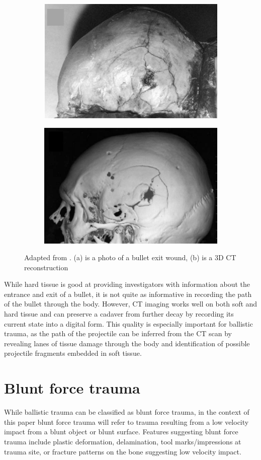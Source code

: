 \documentclass[titlepage]{article}
\begin{document}
\begin{figure}[h!]
\centering
\begin{subfigure}{.5\textwidth}
  \centering
  \includegraphics[width=.7\linewidth]{exit}
  \caption{}
  \end{subfigure}%
\begin{subfigure}{.5\textwidth}
  \centering
  \includegraphics[width=.7\linewidth]{exit_ct}
  \caption{}
\end{subfigure}
\caption{Adapted from \cite{post-imaging}. (a) is a photo of a bullet exit wound, (b) is a 3D CT reconstruction}
\label{fig:exit_wound}
\end{figure}

While hard tissue is good at providing investigators with information about the entrance and exit of a bullet, it is not quite as informative in recording the path of the bullet through the body. However, CT imaging works well on both soft and hard tissue and can preserve a cadaver from further decay by recording its current state into a digital form. This quality is especially important for ballistic trauma, as the path of the projectile can be inferred from the CT scan by revealing lanes of tissue damage through the body and identification of possible projectile fragments embedded in soft tissue.

\section{Blunt force trauma}
While ballistic trauma can be classified as blunt force trauma, in the context of this paper blunt force trauma will refer to trauma resulting from a low velocity impact from a blunt object or blunt surface. Features suggesting blunt force trauma include plastic deformation, delamination, tool marks/impressions at trauma site, or fracture patterns on the bone suggesting low velocity impact.\cite{trauma}
\end{document}
